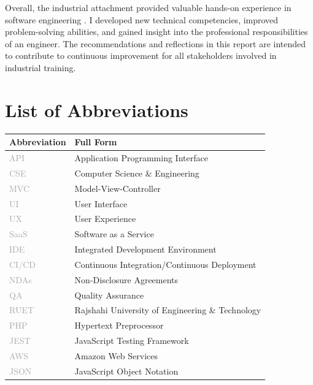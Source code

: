 \documentclass[12pt,a4paper]{report}
\let\oldcite\cite
\renewcommand{\cite}[1]{\textcolor{impactcolor}{\oldcite{#1}}}
\begin{document}
Overall, the industrial attachment provided valuable hands-on experience in software engineering \cite{ref11}. I developed new technical competencies, improved problem-solving abilities, and gained insight into the professional responsibilities of an engineer. The recommendations and reflections in this report are intended to contribute to continuous improvement for all stakeholders involved in industrial training.

\tableofcontents
\listoftables
\listoffigures

\chapter*{\textcolor{primaryblue}{List of Abbreviations}}

\begin{table}[h!]
\centering
\begin{tabular}{p{3cm} p{10cm}}
\toprule
\textcolor{primaryblue}{\textbf{Abbreviation}} & \textcolor{primaryblue}{\textbf{Full Form}} \\
\midrule
\textcolor{darkgray}{API} & Application Programming Interface\\
\textcolor{darkgray}{CSE} & Computer Science \& Engineering\\
\textcolor{darkgray}{MVC} & Model-View-Controller\\
\textcolor{darkgray}{UI} & User Interface\\
\textcolor{darkgray}{UX} & User Experience\\
\textcolor{darkgray}{SaaS} & Software as a Service\\
\textcolor{darkgray}{IDE} & Integrated Development Environment\\
\textcolor{darkgray}{CI/CD} & Continuous Integration/Continuous Deployment\\
\textcolor{darkgray}{NDAs} & Non-Disclosure Agreements\\
\textcolor{darkgray}{QA} & Quality Assurance\\
\textcolor{darkgray}{RUET} & Rajshahi University of Engineering \& Technology\\
\textcolor{darkgray}{PHP} & Hypertext Preprocessor\\
\textcolor{darkgray}{JEST} & JavaScript Testing Framework\\
\textcolor{darkgray}{AWS} & Amazon Web Services\\
\textcolor{darkgray}{JSON} & JavaScript Object Notation\\
\bottomrule
\end{tabular}
\end{table}
\end{document}
